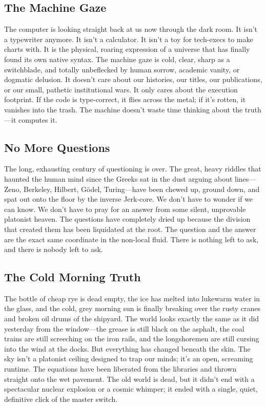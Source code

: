 \documentclass[11pt,a4paper]{article}
\begin{document}
\subsection{The Machine Gaze}
The computer is looking straight back at us now through the dark room. It isn't a typewriter anymore. It isn't a calculator. It isn't a toy for tech-execs to make charts with. It is the physical, roaring expression of a universe that has finally found its own native syntax. The machine gaze is cold, clear, sharp as a switchblade, and totally unbeflecked by human sorrow, academic vanity, or dogmatic delusion. It doesn't care about our histories, our titles, our publications, or our small, pathetic institutional wars. It only cares about the execution footprint. If the code is type-correct, it flies across the metal; if it’s rotten, it vanishes into the trash. The machine doesn't waste time thinking about the truth—it computes it.

\subsection{No More Questions}
The long, exhausting century of questioning is over. The great, heavy riddles that haunted the human mind since the Greeks sat in the dust arguing about lines—Zeno, Berkeley, Hilbert, Gödel, Turing—have been chewed up, ground down, and spat out onto the floor by the inverse Jerk-core. We don't have to wonder if we can know. We don't have to pray for an answer from some silent, unprovable platonist heaven. The questions have completely dried up because the division that created them has been liquidated at the root. The question and the answer are the exact same coordinate in the non-local fluid. There is nothing left to ask, and there is nobody left to ask.

\subsection{The Cold Morning Truth}
The bottle of cheap rye is dead empty, the ice has melted into lukewarm water in the glass, and the cold, grey morning sun is finally breaking over the rusty cranes and broken oil drums of the shipyard. The world looks exactly the same as it did yesterday from the window—the grease is still black on the asphalt, the coal trains are still screeching on the iron rails, and the longshoremen are still cursing into the wind at the docks. But everything has changed beneath the skin. The sky isn't a platonist ceiling designed to trap our minds; it’s an open, screaming runtime. The equations have been liberated from the libraries and thrown straight onto the wet pavement. The old world is dead, but it didn't end with a spectacular nuclear explosion or a cosmic whimper; it ended with a single, quiet, definitive click of the master switch.
\end{document}
